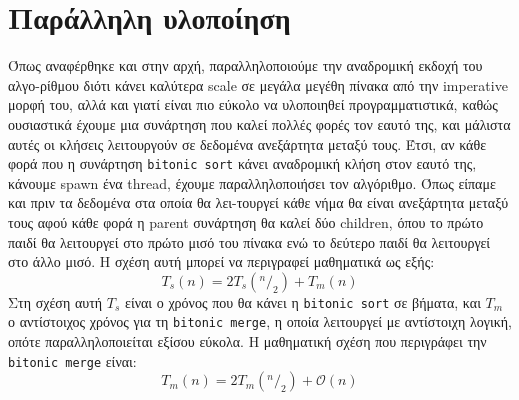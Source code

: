 \documentclass[11pt,a4paper,titlepage]{article}
\newcommand*\rfrac[2]{{}^{#1}\!/_{#2}}
\begin{document}
	\section{Παράλληλη υλοποίηση} 
		Όπως αναφέρθηκε και στην αρχή, παραλληλοποιούμε την αναδρομική εκδοχή του αλγο-ρίθμου διότι κάνει καλύτερα scale σε μεγάλα μεγέθη πίνακα από την imperative μορφή του, αλλά και γιατί είναι πιο εύκολο να υλοποιηθεί προγραμματιστικά, καθώς ουσιαστικά έχουμε μια συνάρτηση που καλεί πολλές φορές τον εαυτό της, και μάλιστα αυτές οι κλήσεις λειτουργούν σε δεδομένα ανεξάρτητα μεταξύ τους. Έτσι, αν κάθε φορά που η συνάρτηση \verb|bitonic sort| κάνει αναδρομική κλήση στον εαυτό της, κάνουμε spawn ένα thread, έχουμε παραλληλοποιήσει τον αλγόριθμο. Όπως είπαμε και πριν τα δεδομένα στα οποία θα λει-τουργεί κάθε νήμα θα είναι ανεξάρτητα μεταξύ τους αφού κάθε φορά η parent συνάρτηση θα καλεί δύο children, όπου το πρώτο παιδί θα λειτουργεί στο πρώτο μισό του πίνακα ενώ το δεύτερο παιδί θα λειτουργεί στο άλλο μισό. Η σχέση αυτή μπορεί να  περιγραφεί μαθηματικά ως εξής:
		\[T_s(n) = 2T_s\left(\rfrac{n}{2}\right) + T_m(n)\]
		Στη σχέση αυτή $T_s$ είναι ο χρόνος που θα κάνει η \verb|bitonic sort| σε βήματα, και $T_m$ ο αντίστοιχος χρόνος για τη \verb|bitonic merge|, η οποία λειτουργεί με αντίστοιχη λογική, οπότε παραλληλοποιείται εξίσου εύκολα. Η μαθηματική σχέση που περιγράφει την \verb|bitonic merge| είναι:
		\[T_m(n) = 2T_m\left(\rfrac{n}{2}\right) + \mathcal{O}\left(n\right)\]
		
\end{document}
